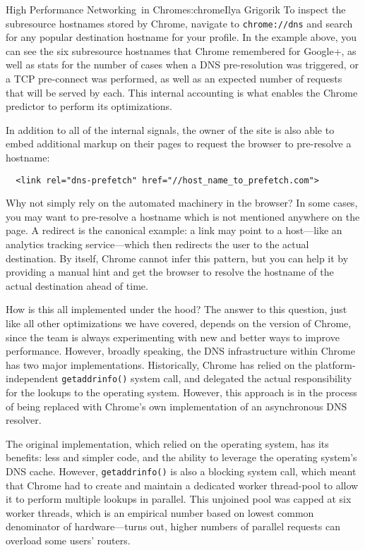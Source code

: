 \begin{aosachapter}{High Performance Networking~in Chrome}{s:chrome}{Ilya Grigorik}
To inspect the subresource hostnames stored by Chrome, navigate to
\texttt{chrome://dns} and search for any popular destination hostname
for your profile. In the example above, you can see the six subresource
hostnames that Chrome remembered for Google+, as well as stats for the
number of cases when a DNS pre-resolution was triggered, or a TCP
pre-connect was performed, as well as an expected number of requests
that will be served by each. This internal accounting is what enables
the Chrome predictor to perform its optimizations.

In addition to all of the internal signals, the owner of the site is
also able to embed additional markup on their pages to request the
browser to pre-resolve a hostname:

\begin{verbatim}
  <link rel="dns-prefetch" href="//host_name_to_prefetch.com">
\end{verbatim}

Why not simply rely on the automated machinery in the browser? In some
cases, you may want to pre-resolve a hostname which is not mentioned
anywhere on the page. A redirect is the canonical example: a link may
point to a host---like an analytics tracking service---which then
redirects the user to the actual destination. By itself, Chrome cannot
infer this pattern, but you can help it by providing a manual hint and
get the browser to resolve the hostname of the actual destination ahead
of time.

How is this all implemented under the hood? The answer to this question,
just like all other optimizations we have covered, depends on the
version of Chrome, since the team is always experimenting with new and
better ways to improve performance. However, broadly speaking, the DNS
infrastructure within Chrome has two major implementations.
Historically, Chrome has relied on the platform-independent
\texttt{getaddrinfo()} system call, and delegated the actual
responsibility for the lookups to the operating system. However, this
approach is in the process of being replaced with Chrome's own
implementation of an asynchronous DNS resolver.

The original implementation, which relied on the operating system, has
its benefits: less and simpler code, and the ability to leverage the
operating system's DNS cache. However, \texttt{getaddrinfo()} is also a
blocking system call, which meant that Chrome had to create and maintain
a dedicated worker thread-pool to allow it to perform multiple lookups
in parallel. This unjoined pool was capped at six worker threads, which
is an empirical number based on lowest common denominator of
hardware---turns out, higher numbers of parallel requests can overload
some users' routers.


\end{aosachapter}
